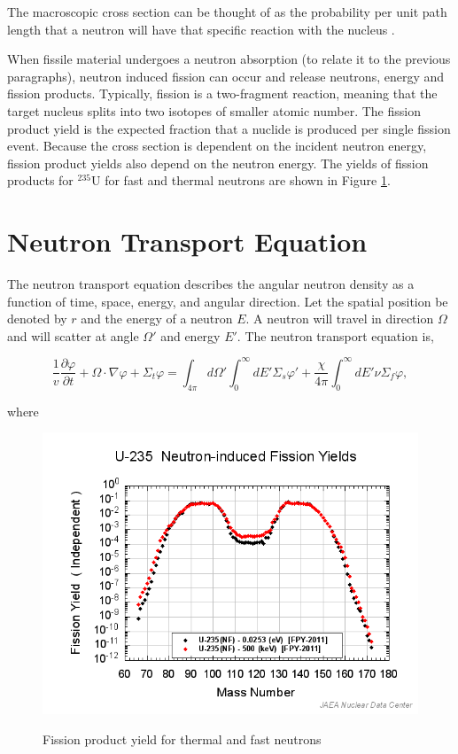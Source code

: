 \noindent The macroscopic cross section can be thought of as the probability per unit path length that a neutron will have that specific reaction with the nucleus \cite{duderstadt1976}. 

When fissile material undergoes a neutron absorption (to relate it to the previous paragraphs), neutron induced fission can occur and release neutrons, energy and fission products. Typically, fission is a two-fragment reaction, meaning that the target nucleus splits into two isotopes of smaller atomic number. The fission product yield is the expected fraction that a nuclide is produced per single fission event. Because the cross section is dependent on the incident neutron energy, fission product yields also depend on the neutron energy. The yields of fission products for ${}^{235}$U for fast and thermal neutrons are shown in Figure \ref{fig:fissionYield}.



\section{Neutron Transport Equation}
The neutron transport equation describes the angular neutron density as a function of time, space, energy, and angular direction. Let the spatial position be denoted by $r$ and the energy of a neutron $E$. A neutron will travel in direction $\Omega$ and will scatter at angle $\Omega'$ and energy $E'$.  The neutron transport equation is,

\begin{equation}
    \frac{1}{v}\frac{\partial \varphi}{\partial t} + \Omega \cdot \nabla \varphi + \Sigma_{t}\varphi = \int_{4\pi} d\Omega'\int_{0}^{\infty}dE'\Sigma_{s}\varphi' + \frac{\chi}{4\pi}\int_{0}^{\infty}dE'\nu\Sigma_{f}\varphi,
    \label{eq:angularNeutronTransport}
\end{equation}

\noindent where 

\clearpage

\begin{figure}[t]
  \centering
  \includegraphics[width=5.5in]{images/chapter-2/fissionYield.png}\\
  \caption{Fission product yield for thermal and fast neutrons}
  \label{fig:fissionYield}
\end{figure} 

